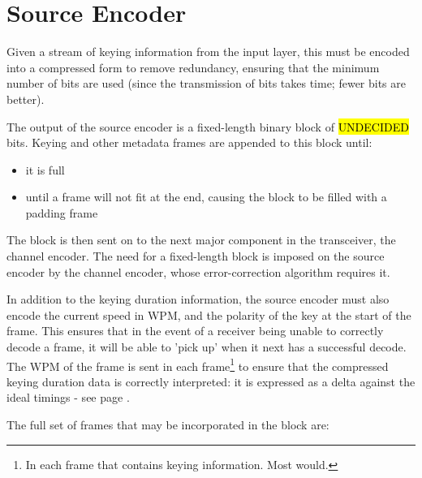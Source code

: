 \documentclass[a4paper]{tufte-handout}
\begin{document}
\section{Source Encoder}
Given a stream of keying information from the input layer, this must be encoded into a compressed form to remove redundancy, ensuring that the minimum number of bits are used (since the transmission of bits takes time; fewer bits are better).

The output of the source encoder is a fixed-length binary block of \hl{UNDECIDED} bits. Keying and other metadata frames are appended to this block until:
\begin{itemize}
    \setlength\itemsep{-0.5em}
	\item it is full
	\item until a frame will not fit at the end, causing the block to be filled with a padding frame
\end{itemize}
The block is then sent on to the next major component in the transceiver, the channel encoder.
The need for a fixed-length block is imposed on the source encoder by the channel encoder, whose error-correction algorithm requires it.

In addition to the keying duration information, the source encoder must also encode the current speed in WPM, and the polarity of the key at the start of the frame. This ensures that in the event of a receiver being unable to correctly decode a frame, it will be able to 'pick up' when it next has a successful decode. The WPM of the frame is sent in each frame\footnote{In each frame that contains keying information. Most would.} to ensure that the compressed keying duration data is correctly interpreted: it is expressed as a delta against the ideal timings - see page \pageref{section:delta-encoding}.

The full set of frames that may be incorporated in the block are:
\end{document}
